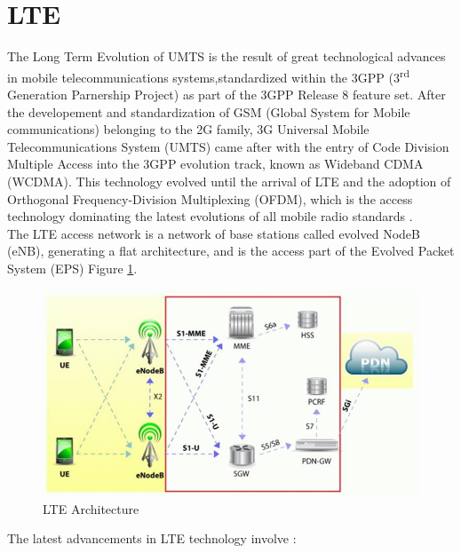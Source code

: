 \section{LTE}\label{sec:chap2_lte}

The Long Term Evolution of UMTS is the result of great technological advances in mobile telecommunications systems,standardized within the 3GPP (3\textsuperscript{rd} Generation Parnership Project) as part of the 3GPP Release 8 feature set. After the developement and standardization of GSM (Global System for Mobile communications) belonging to the 2G family, 3G  Universal Mobile Telecommunications System (UMTS) came after with the entry of Code Division Multiple Access into the 3GPP evolution track, known as Wideband CDMA (WCDMA). This technology evolved until the arrival of LTE and the adoption of Orthogonal Frequency-Division Multiplexing (OFDM), which is the access technology dominating the latest evolutions of all mobile radio standards \cite{lte_history}.\\

The LTE access network is a network of base stations called evolved NodeB (eNB), generating a flat architecture, and is the access part of the Evolved Packet System (EPS) Figure \ref{lte_arch-fig}.

\begin{center}
\begin{figure}[h!]
  \centering
    \includegraphics[scale=0.7]{./images/lte_arch}
	\caption{LTE Architecture}
	\label{lte_arch-fig}
\end{figure}
\end{center}

The latest advancements in LTE technology involve \cite{lte_wp}:

